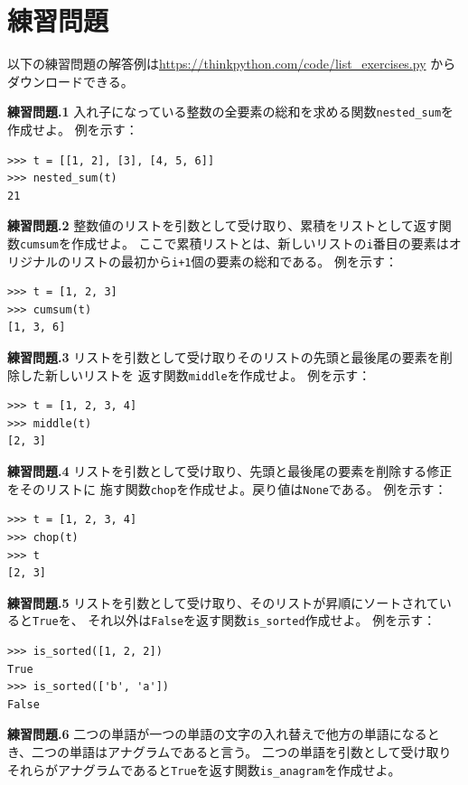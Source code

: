 \documentclass[a4j,12pt,makeidx]{jbook}
\newcommand{\tp}{\thechapter}
\begin{document}
\section{練習問題}
以下の練習問題の解答例は\url{https://thinkpython.com/code/list_exercises.py}
からダウンロードできる。

\noindent
{\bf 練習問題\tp.1} 入れ子になっている整数の全要素の総和を求める関数{\tt nested\_sum}を作成せよ。
例を示す：
\begin{verbatim}
>>> t = [[1, 2], [3], [4, 5, 6]]
>>> nested_sum(t)
21
\end{verbatim} \par

\noindent
{\bf 練習問題\tp.2} 整数値のリストを引数として受け取り、累積をリストとして返す関数{\tt cumsum}を作成せよ。
ここで累積リストとは、新しいリストの{\tt i}番目の要素はオリジナルのリストの最初から{\tt i+1}個の要素の総和である。
例を示す：
\begin{verbatim}
>>> t = [1, 2, 3]
>>> cumsum(t)
[1, 3, 6]
\end{verbatim} \par

\noindent
{\bf 練習問題\tp.3} リストを引数として受け取りそのリストの先頭と最後尾の要素を削除した新しいリストを
返す関数{\tt middle}を作成せよ。
例を示す：
\begin{verbatim}
>>> t = [1, 2, 3, 4]
>>> middle(t)
[2, 3]
\end{verbatim} \par

\noindent
{\bf 練習問題\tp.4} リストを引数として受け取り、先頭と最後尾の要素を削除する修正をそのリストに
施す関数{\tt chop}を作成せよ。戻り値は{\tt None}である。
例を示す：
\begin{verbatim}
>>> t = [1, 2, 3, 4]
>>> chop(t)
>>> t
[2, 3]
\end{verbatim} \par

\noindent
{\bf 練習問題\tp.5} リストを引数として受け取り、そのリストが昇順にソートされていると{\tt True}を、
それ以外は{\tt False}を返す関数{\tt is\_sorted}作成せよ。
例を示す：
\begin{verbatim}
>>> is_sorted([1, 2, 2])
True
>>> is_sorted(['b', 'a'])
False
\end{verbatim} \par

\noindent
{\bf 練習問題\tp.6} 二つの単語が一つの単語の文字の入れ替えで他方の単語になるとき、二つの単語はアナグラムであると言う。
二つの単語を引数として受け取りそれらがアナグラムであると{\tt True}を返す関数{\tt is\_anagram}を作成せよ。\\
\end{document}
